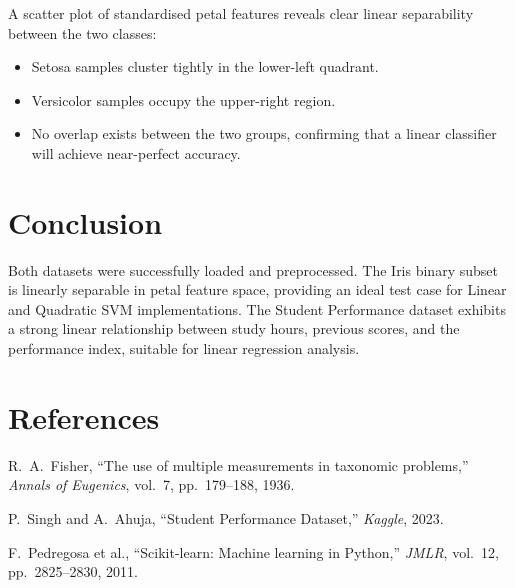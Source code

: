 \documentclass[12pt,a4paper]{article}
\begin{document}
A scatter plot of standardised petal features reveals clear linear separability between the two classes:

\begin{itemize}
  \item Setosa samples cluster tightly in the lower-left quadrant.
  \item Versicolor samples occupy the upper-right region.
  \item No overlap exists between the two groups, confirming that a linear classifier will achieve near-perfect accuracy.
\end{itemize}

\section{Conclusion}

Both datasets were successfully loaded and preprocessed. The Iris binary subset is linearly separable in petal feature space, providing an ideal test case for Linear and Quadratic SVM implementations. The Student Performance dataset exhibits a strong linear relationship between study hours, previous scores, and the performance index, suitable for linear regression analysis.

\section{References}
\begin{enumerate}[label={[\arabic*]}]
  \item R.\ A.\ Fisher, ``The use of multiple measurements in taxonomic problems,'' \textit{Annals of Eugenics}, vol.\ 7, pp.\ 179--188, 1936.
  \item P.\ Singh and A.\ Ahuja, ``Student Performance Dataset,'' \textit{Kaggle}, 2023.
  \item F.\ Pedregosa et al., ``Scikit-learn: Machine learning in Python,'' \textit{JMLR}, vol.\ 12, pp.\ 2825--2830, 2011.
\end{enumerate}
\end{document}
